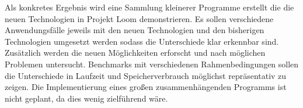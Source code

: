 

Als konkretes Ergebnis wird eine Sammlung kleinerer Programme erstellt die die neuen Technologien in Projekt Loom demonstrieren.
Es sollen verschiedene Anwendungsfälle jeweils mit den neuen Technologien und den bisherigen Technologien umgesetzt werden sodass die Unterschiede klar erkennbar sind.
Zusätzlich werden die neuen Möglichkeiten erforscht und nach möglichen Problemen untersucht.
Benchmarks mit verschiedenen Rahmenbedingungen sollen die Unterschiede in Laufzeit und Speicherverbrauch möglichst repräsentativ zu zeigen.
Die Implementierung eines großen zusammenhängenden Programms ist nicht geplant, da dies wenig zielführend wäre.
